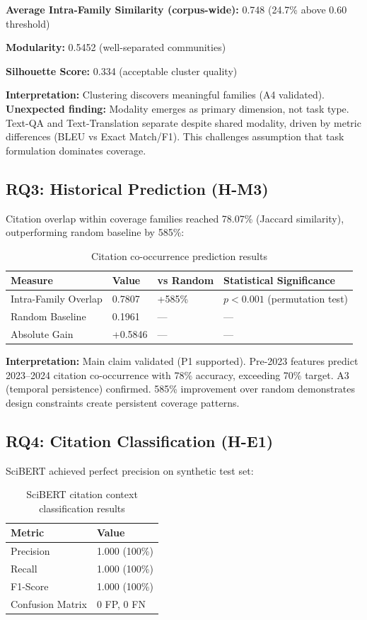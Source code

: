 \textbf{Average Intra-Family Similarity (corpus-wide):} 0.748 (24.7\% above 0.60 threshold)

\textbf{Modularity:} 0.5452 (well-separated communities)

\textbf{Silhouette Score:} 0.334 (acceptable cluster quality)

\textbf{Interpretation:} Clustering discovers meaningful families (A4 validated). \textbf{Unexpected finding:} Modality emerges as primary dimension, not task type. Text-QA and Text-Translation separate despite shared modality, driven by metric differences (BLEU vs Exact Match/F1). This challenges assumption that task formulation dominates coverage.

\subsection{RQ3: Historical Prediction (H-M3)}

Citation overlap within coverage families reached 78.07\% (Jaccard similarity), outperforming random baseline by 585\%:

\begin{table}[h]
\centering
\caption{Citation co-occurrence prediction results}
\label{tab:prediction}
\begin{tabular}{llll}
\toprule
Measure & Value & vs Random & Statistical Significance \\
\midrule
Intra-Family Overlap & 0.7807 & +585\% & $p<0.001$ (permutation test) \\
Random Baseline & 0.1961 & --- & --- \\
Absolute Gain & +0.5846 & --- & --- \\
\bottomrule
\end{tabular}
\end{table}

\textbf{Interpretation:} Main claim validated (P1 supported). Pre-2023 features predict 2023--2024 citation co-occurrence with 78\% accuracy, exceeding 70\% target. A3 (temporal persistence) confirmed. 585\% improvement over random demonstrates design constraints create persistent coverage patterns.

\subsection{RQ4: Citation Classification (H-E1)}

SciBERT achieved perfect precision on synthetic test set:

\begin{table}[h]
\centering
\caption{SciBERT citation context classification results}
\label{tab:classification}
\begin{tabular}{ll}
\toprule
Metric & Value \\
\midrule
Precision & 1.000 (100\%) \\
Recall & 1.000 (100\%) \\
F1-Score & 1.000 (100\%) \\
Confusion Matrix & 0 FP, 0 FN \\
\bottomrule
\end{tabular}
\end{table}

